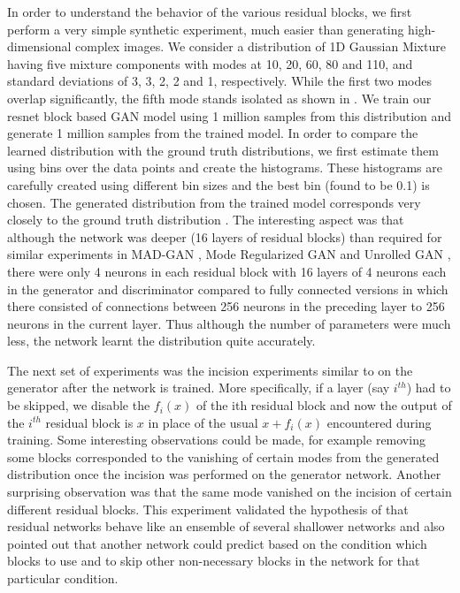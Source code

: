 In order to understand the behavior of the various residual blocks, we first perform a very simple synthetic experiment, much easier than generating high-dimensional complex images. We consider a distribution of 1D Gaussian Mixture \cite{bishop2007pattern} having five mixture components with modes at 10, 20, 60, 80 and 110, and standard deviations of 3, 3, 2, 2 and 1, respectively. While the first two modes overlap significantly, the fifth mode stands isolated as shown in . We train our resnet block based GAN model using 1 million samples from this distribution and generate 1 million samples from the trained model. In order to compare the learned distribution with the ground truth distributions, we first estimate them using bins over the data points and create the histograms. These histograms are carefully created using different bin sizes and the best bin (found to be 0.1) is chosen. The generated distribution from the trained model corresponds very closely to the ground truth distribution . The interesting aspect was that although the network was deeper (16 layers of residual blocks) than required for similar experiments in MAD-GAN \cite{ghosh2017multi}, Mode Regularized GAN \cite{che2016mode} and Unrolled GAN \cite{metz2017unrolledGAN}, there were only 4 neurons in each residual block with 16 layers of 4 neurons each in the generator and discriminator compared to fully connected versions in which there consisted of connections between 256 neurons in the preceding layer to 256 neurons in the current layer. Thus although the number of parameters were much less, the network learnt the distribution quite accurately.

The next set of experiments was the incision experiments similar to \cite{veit2016residual} on the generator after the network is trained. More specifically, if a layer (say $i^{th}$) had to be skipped, we disable the $f_i(x)$ of the ith residual block and now the output of the $i^{th}$ residual block is $x$ in place of the usual $x+f_i(x)$ encountered during training. Some interesting observations could be made, for example removing some blocks corresponded to the vanishing of certain modes from the generated distribution once the incision was performed on the generator network. Another surprising observation was that the same mode vanished on the incision of certain different residual blocks. This experiment validated the hypothesis of \cite{veit2016residual} that residual networks behave like an ensemble of several shallower networks and also pointed out that another network could predict based on the condition which blocks to use and to skip other non-necessary blocks in the network for that particular condition.


